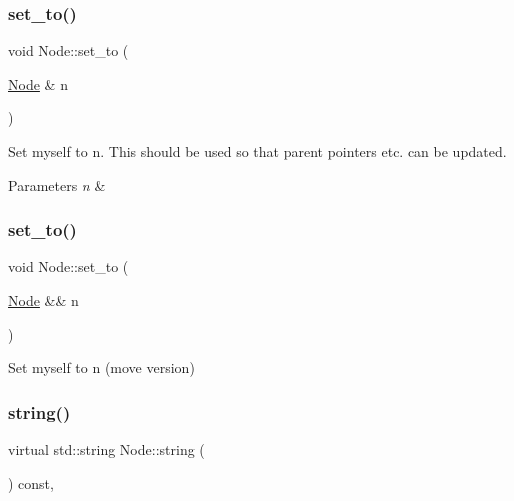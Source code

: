 \subsubsection{\texorpdfstring{set\+\_\+to()}{set\_to()}\hspace{0.1cm}{\footnotesize\ttfamily [1/2]}}
{\footnotesize\ttfamily void Node\+::set\+\_\+to (\begin{DoxyParamCaption}\item[{\hyperlink{class_node}{Node} \&}]{n }\end{DoxyParamCaption})\hspace{0.3cm}{\ttfamily [inline]}}

Set myself to n. This should be used so that parent pointers etc. can be updated. 
\begin{DoxyParams}{Parameters}
{\em n} & \\
\hline
\end{DoxyParams}
\mbox{\label{class_node_a10c63ea2ec819dc5b195c4df33cde113}} 
\subsubsection{\texorpdfstring{set\+\_\+to()}{set\_to()}\hspace{0.1cm}{\footnotesize\ttfamily [2/2]}}
{\footnotesize\ttfamily void Node\+::set\+\_\+to (\begin{DoxyParamCaption}\item[{\hyperlink{class_node}{Node} \&\&}]{n }\end{DoxyParamCaption})\hspace{0.3cm}{\ttfamily [inline]}}

Set myself to n (move version)\mbox{\label{class_node_a0590ae269543416be9c4ebdf70bad73b}} 
\subsubsection{\texorpdfstring{string()}{string()}}
{\footnotesize\ttfamily virtual std\+::string Node\+::string (\begin{DoxyParamCaption}{ }\end{DoxyParamCaption}) const\hspace{0.3cm}{\ttfamily [inline]}, {\ttfamily [virtual]}}

